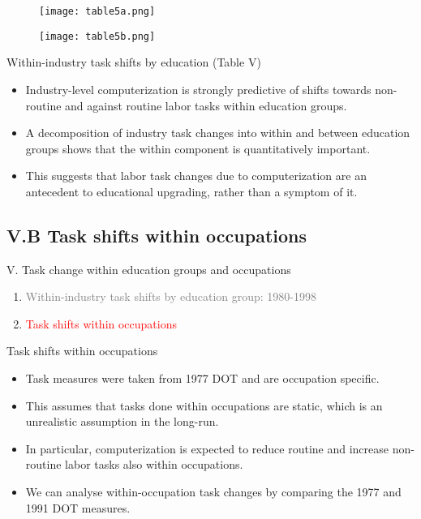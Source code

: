 \documentclass[notes=show]{beamer}
\begin{document}
\newpage
\begin{center}
\begin{figure}
\texttt{[image: table5a.png]}
\end{figure} 
\end{center}
\newpage

\newpage
\begin{center}
\begin{figure}
\texttt{[image: table5b.png]}
\end{figure} 
\end{center}
\newpage

\begin{frame}{Within-industry task shifts by education (Table V)}
\begin{itemize}
\item Industry-level computerization is strongly predictive of shifts towards non-routine and against routine labor tasks within education groups.\medskip
\item A decomposition of industry task changes into within and between education groups shows that the within component is quantitatively important.\medskip
\item This suggests that labor task changes due to computerization are an antecedent to educational upgrading, rather than a symptom of it.
\end{itemize}
\end{frame}

\subsection{V.B Task shifts within occupations}

\begin{frame}{V. Task change within education groups and occupations}
\begin{enumerate}
\item[\textcolor{gray}{V.A}] \textcolor{gray}{Within-industry task shifts by education group: 1980-1998}  \bigskip
\item[\textcolor{red}{V.B}]  \textcolor{red}{Task shifts within occupations}
\end{enumerate}
\end{frame}

\begin{frame}{Task shifts within occupations}
\begin{itemize}
\item Task measures were taken from 1977 DOT and are occupation specific.\medskip
\item This assumes that tasks done within occupations are static, which is an unrealistic assumption in the long-run.\medskip
\item In particular, computerization is expected to reduce routine and increase non-routine labor tasks also within occupations. \medskip
\item We can analyse within-occupation task changes by comparing the 1977 and 1991 DOT measures. 
\end{itemize}
\end{frame}
\end{document}
